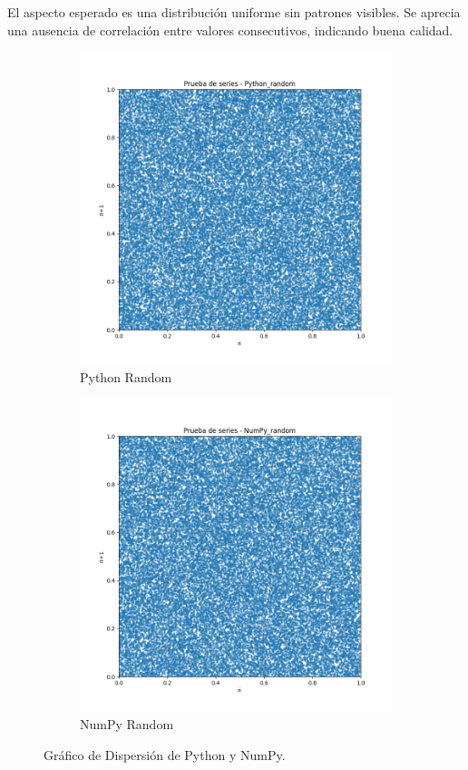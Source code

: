 \documentclass{article}
\begin{document}
El aspecto esperado es una distribución uniforme sin patrones visibles.
Se aprecia una ausencia de correlación entre valores consecutivos, indicando buena calidad.
\begin{figure}[H]
\centering
\begin{subfigure}[b]{0.45\textwidth}
    \includegraphics[width=\textwidth]{Imagenes/series_Python_random.png}
    \caption{Python Random}
\end{subfigure}
\hfill
\begin{subfigure}[b]{0.45\textwidth}
    \includegraphics[width=\textwidth]{Imagenes/series_NumPy_random.png}
    \caption{NumPy Random}
\end{subfigure}
\caption{Gráfico de Dispersión de Python y NumPy.}
\end{figure}
\end{document}
